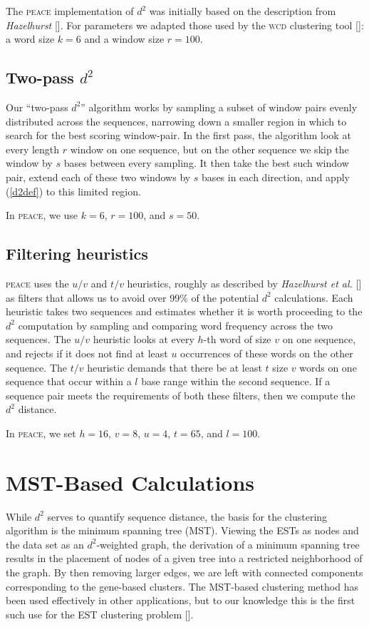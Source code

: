 \documentclass[a4paper,12pt]{article}
\begin{document}
\begin{appendix}
The \textsc{peace} implementation of $d^2$ was initially based on the description from
{\it Hazelhurst} [\cite{Hazelhurst04}].  For parameters
we adapted those used by the \textsc{wcd} clustering tool [\cite{Hazelhurst08a}]:
a word size $k=6$ and a window size $r=100$.

\subsection{Two-pass $d^2$}
Our ``two-pass $d^2$'' algorithm works by sampling a subset of window
pairs evenly distributed across the sequences, narrowing down a
smaller region in which to search for the best scoring window-pair.
In the first pass, the algorithm look at every length $r$ window on one sequence,
but on the other sequence we skip the window by $s$ bases between
every sampling.  It then take the best such window pair, extend
each of these two windows by $s$ bases in each direction, and apply
(\ref{d2def}) to this limited region.

In \textsc{peace}, we use $k=6$, $r=100$, and $s=50$.

\subsection{Filtering heuristics}
\textsc{peace} uses the $u/v$ and $t/v$ heuristics, roughly as described by {\it
  Hazelhurst et al.} [\cite{Hazelhurst08a}] as filters that allows us to avoid
over 99\% of the potential $d^2$ calculations.  Each heuristic takes two
sequences and estimates whether it is worth proceeding to the $d^2$
computation by sampling and comparing word frequency across the two
sequences.  The $u/v$ heuristic looks at every $h$-th word of size $v$
on one sequence, and rejects if it does not find at least $u$ occurrences
of these words on the other sequence.  The $t/v$ heuristic demands
that there be at least $t$ size $v$ words on one sequence that occur
within a $l$ base range within the second sequence.  If a sequence
pair meets the requirements of both these filters, then we compute the
$d^2$ distance.

In \textsc{peace}, we set $h=16$, $v=8$, $u=4$, $t=65$, and $l=100$.

\section{MST-Based  Calculations}

While $d^2$ serves to quantify sequence distance, the basis for the
clustering algorithm is the minimum spanning tree (MST).  Viewing the
ESTs as nodes and the data set as an $d^2$-weighted graph, the
derivation of a minimum spanning tree results in the placement of
nodes of a given tree into a restricted neighborhood of the graph.  By
then removing larger edges, we are left with connected components
corresponding to the gene-based clusters.  The MST-based clustering
method has been used effectively in other applications, but to our
knowledge this is the first such use for the  EST
clustering problem [\cite{Jain99,Wan08}].


\end{appendix}
\end{document}
